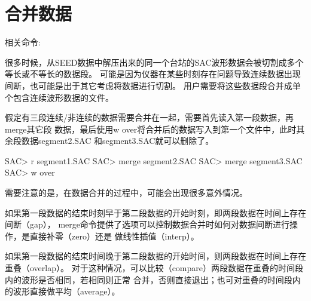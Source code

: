 \section{合并数据}
相关命令: 

很多时候，从SEED数据中解压出来的同一个台站的SAC波形数据会被切割成多个等长或不等长的数据段。
可能是因为仪器在某些时刻存在问题导致连续数据出现间断，也可能是出于其它考虑将数据进行切割。
用户需要将这些数据段合并成单个包含连续波形数据的文件。

假定有三段连续/非连续的数据需要合并在一起，需要首先读入第一段数据，再merge其它段
数据，最后使用w over将合并后的数据写入到第一个文件中，此时其余段数据segment2.SAC
和segment3.SAC就可以删除了。

\begin{SACCode}
SAC> r segment1.SAC
SAC> merge segment2.SAC
SAC> merge segment3.SAC
SAC> w over
\end{SACCode}

需要注意的是，在数据合并的过程中，可能会出现很多意外情况。

如果第一段数据的结束时刻早于第二段数据的开始时刻，即两段数据在时间上存在间断（gap），
merge命令提供了选项可以控制数据合并时如何对数据间断进行操作，是直接补零（zero）还是
做线性插值（interp）。

如果第一段数据的结束时间晚于第二段数据的开始时间，则两段数据在时间上存在重叠（overlap）。
对于这种情况，可以比较（compare）两段数据在重叠的时间段内的波形是否相同，若相同则正常
合并，否则直接退出；也可对重叠的时间段内的波形直接做平均（average）。